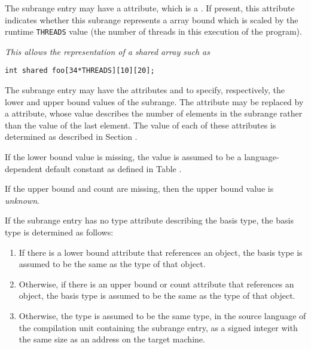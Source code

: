 The\hypertarget{chap:DWATthreadsscaledupcarrayboundthreadsscalfactor}{}
subrange entry may have a 
\DWATthreadsscaledDEFN{} attribute,
which is a . 
If present, this attribute indicates whether
this subrange represents a  array bound which is scaled
by the runtime \texttt{THREADS} value (the number of  threads in
this execution of the program).

\textit{This allows the representation of a  shared array such as}

\begin{lstlisting}[numbers=none]
int shared foo[34*THREADS][10][20];
\end{lstlisting}

The\hypertarget{chap:DWATlowerboundlowerboundofsubrange}{}
subrange\hypertarget{chap:DWATupperboundupperboundofsubrange}{}
entry may have the attributes 
\DWATlowerboundDEFN{}
and \DWATupperboundDEFN{}
 to specify, respectively, the lower
and upper bound values of the subrange. The 
\DWATupperboundNAME{} 
attribute\hypertarget{chap:DWATcountelementsofsubrangetype}{}
may be replaced by a
\DWATcountDEFN{} attribute, 
whose value describes the number of elements in the subrange 
rather than the value of the last element. The value of each 
of these attributes is determined as described in 
Section .

If the lower bound value is missing, the value is assumed to
be a language-dependent default constant as defined in
Table .

If the upper bound and count are missing, then the upper bound value is 
\textit{unknown}.

If the subrange entry has no type attribute describing the
basis type, the basis type is determined as follows:
\begin{enumerate}[1. ]
\item
If there is a lower bound attribute that references an object,
the basis type is assumed to be the same as the type of that object.
\item
Otherwise, if there is an upper bound or count attribute that references
an object, the basis type is assumed to be the same as the type of that object.
\item
Otherwise, the type is
assumed to be the same type, in the source language of the
compilation unit containing the subrange entry, as a signed
integer with the same size as an address on the target machine.
\end{enumerate}

